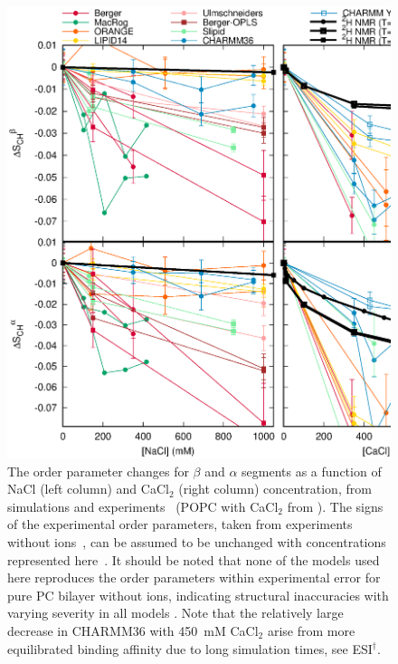 \documentclass[twoside,twocolumn,9pt]{article}
\begin{document}
\begin{figure}[t]
  \centering
  \includegraphics[width=15cm]{../Fig/OrderParameterIONSchanges.eps}
  \caption{\label{ordPions}
    The order parameter changes for $\beta$ and $\alpha$ segments as a function of NaCl (left column) 
    and CaCl$_2$ (right column) concentration, from simulations and experiments~\cite{akutsu81} 
    (POPC with CaCl$_2$ from \cite{altenbach84}). The signs of the experimental order parameters, taken from
    experiments without ions~\cite{hong95a,hong95b,gross97}, can be assumed to be unchanged 
    with concentrations represented here~\cite{altenbach84,ollila16}. 
    It should be noted that none of the models used here reproduces the order parameters
    within experimental error for pure PC bilayer without ions, indicating structural inaccuracies with varying severity in all
    models \cite{botan15}. Note that the relatively large decrease in CHARMM36 with 450~mM CaCl$_2$ arise from more equilibrated binding 
    affinity due to long simulation times, see ESI$^\dag$.
  }
\end{figure}
\end{document}
